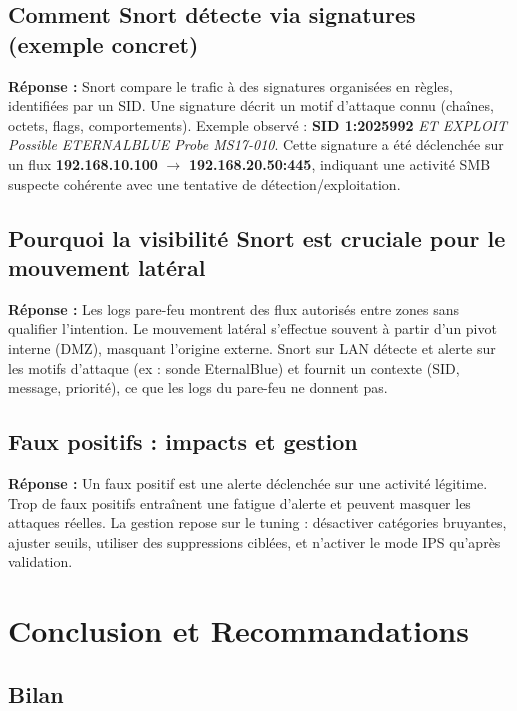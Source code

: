 \documentclass[12pt,a4paper,openany]{report}
\begin{document}
	\section{Comment Snort détecte via signatures (exemple concret)}
	
	\textbf{Réponse :} Snort compare le trafic à des signatures organisées en règles, identifiées par un SID. Une signature décrit un motif d'attaque connu (chaînes, octets, flags, comportements). Exemple observé : \textbf{SID 1:2025992} \textit{ET EXPLOIT Possible ETERNALBLUE Probe MS17-010}. Cette signature a été déclenchée sur un flux \textbf{192.168.10.100} $\rightarrow$ \textbf{192.168.20.50:445}, indiquant une activité SMB suspecte cohérente avec une tentative de détection/exploitation.
	
	\section{Pourquoi la visibilité Snort est cruciale pour le mouvement latéral}
	
	\textbf{Réponse :} Les logs pare-feu montrent des flux autorisés entre zones sans qualifier l'intention. Le mouvement latéral s'effectue souvent à partir d'un pivot interne (DMZ), masquant l'origine externe. Snort sur LAN détecte et alerte sur les motifs d'attaque (ex : sonde EternalBlue) et fournit un contexte (SID, message, priorité), ce que les logs du pare-feu ne donnent pas.
	
	\section{Faux positifs : impacts et gestion}
	
	\textbf{Réponse :} Un faux positif est une alerte déclenchée sur une activité légitime. Trop de faux positifs entraînent une fatigue d'alerte et peuvent masquer les attaques réelles. La gestion repose sur le tuning : désactiver catégories bruyantes, ajuster seuils, utiliser des suppressions ciblées, et n'activer le mode IPS qu'après validation.
	
	\chapter{Conclusion et Recommandations}
	
	\section{Bilan}
	
\end{document}
